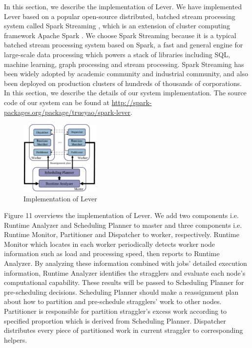 \documentclass[10pt,conference,compsocconf,letterpaper]{IEEEtran}
\begin{document}
  In this section, we describe the implementation of Lever. We have implemented Lever based on a popular open-source distributed, batched stream processing system called Spark Streaming \cite{spark-streaming}, which is an extension of cluster computing framework Apache Spark \cite{spark}. We choose Spark Streaming because it is a typical batched stream processing system based on Spark, a fast and general engine for large-scale data processing which powers a stack of libraries including SQL, machine learning, graph processing and stream processing. Spark Streaming has been widely adopted by academic community and industrial community, and also been deployed on production clusters of hundreds of thousands of corporations. In this section, we describe the details of our system implementation. The source code of our system can be found at \url{http://spark-packages.org/package/trueyao/spark-lever}.
  \begin{figure}[htbp]
    \centering
    \includegraphics[width=0.35\textwidth]{Figure7}
    \caption{Implementation of Lever}
    \label{Fig. 11:}
  \end{figure}

  Figure 11 overviews the implementation of Lever. We add two components i.e. Runtime Analyzer and Scheduling Planner to master and three components i.e. Runtime Monitor, Partitioner and Dispatcher to worker, respectively. Runtime Monitor which locates in each worker periodically detects worker node information such as load and processing speed, then reports to Runtime Analyzer. By analyzing these information combined with jobs' detailed execution information, Runtime Analyzer identifies the stragglers and evaluate each node's computational capability. These results will be passed to Scheduling Planner for pre-scheduling decisions. Scheduling Planner should make a reassignment plan about how to partition and pre-schedule stragglers' work to other nodes. Partitioner is responsible for partition straggler's excess work according to specified proportion which is derived from Scheduling Planner. Dispatcher distributes every piece of partitioned work in current straggler to corresponding helpers.
\end{document}
